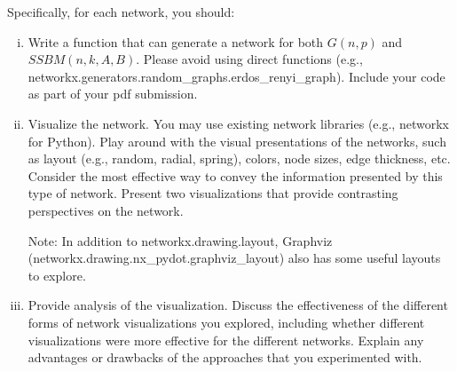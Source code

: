 \documentclass[11pt]{article}
\begin{document}
\noindent Specifically, for each network, you should:

 \begin{enumerate}[(i)]
     \item Write a function that can generate a network for both $G(n,p)$ and $SSBM(n, k, A, B)$. Please avoid using direct functions (e.g., networkx.generators.random\_graphs.erdos\_renyi\_graph). Include your code as part of your pdf submission.
     
     \item Visualize the network. You may use existing network libraries (e.g., networkx for Python). Play around with the visual presentations of the networks, such as layout (e.g., random, radial, spring), colors, node sizes, edge thickness, etc. Consider the most effective way to convey the information presented by this type of network. Present two visualizations that provide contrasting perspectives on the network. 
     
     Note: In addition to networkx.drawing.layout, Graphviz (networkx.drawing.nx\_pydot.graphviz\_layout) also has some useful layouts to explore. 
     
     \item Provide analysis of the visualization. Discuss the effectiveness of the different forms of network visualizations you explored, including whether different visualizations were more effective for the different networks.  Explain any advantages or drawbacks of the approaches that you experimented with.  
     
 \end{enumerate}
\end{document}
